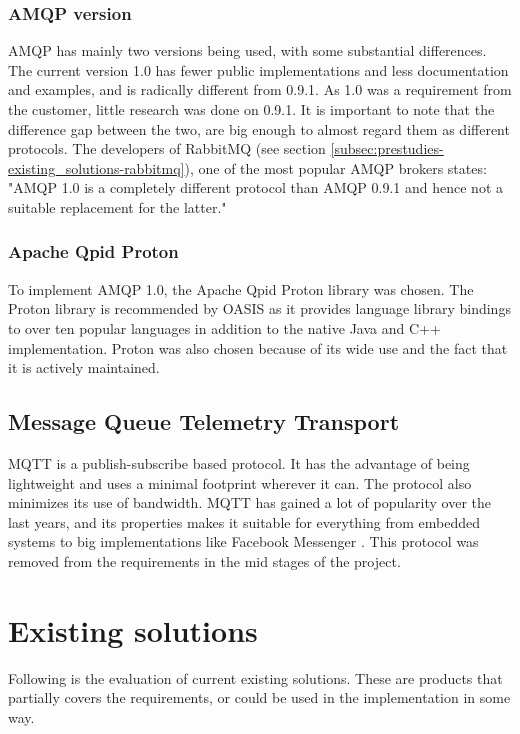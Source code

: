 \subsubsection{AMQP version}
\label{subsec:prestudies-amqp-amqp_version}
AMQP has mainly two versions being used, with some substantial differences. The current version 1.0 has fewer public implementations and less documentation and examples, and is radically different from 0.9.1. As 1.0 was a requirement from the customer, little research was done on 0.9.1. It is important to note that the difference gap between the two, are big enough to almost regard them as different protocols. The developers of RabbitMQ (see section \ref{subsec:prestudies-existing_solutions-rabbitmq}), one of the most popular AMQP brokers states: "AMQP 1.0 is a completely different protocol than AMQP 0.9.1 and hence not a suitable replacement for the latter."

\subsubsection{Apache Qpid Proton}
To implement AMQP 1.0, the Apache Qpid Proton \cite{amqp-qpid-proton} library was chosen. The Proton library is recommended by OASIS as it provides language library bindings to over ten popular languages in addition to the native Java and C++ implementation. Proton was also chosen because of its wide use and the fact that it is actively maintained.

\subsection{Message Queue Telemetry Transport}
\label{subsec:prestudies-mqtt}
MQTT is a publish-subscribe based protocol. It has the advantage of being lightweight and uses a minimal footprint wherever it can. The protocol also minimizes its use of bandwidth. MQTT has gained a lot of popularity over the last years, and its properties makes it suitable for everything from embedded systems to big implementations like Facebook Messenger \cite{facebook-messenger}. This protocol was removed from the requirements in the mid stages of the project.

\section{Existing solutions}
\label{subsec:prestudies-existing_solutions}

Following is the evaluation of current existing solutions. These are products that partially covers the requirements, or could be used in the implementation in some way.

